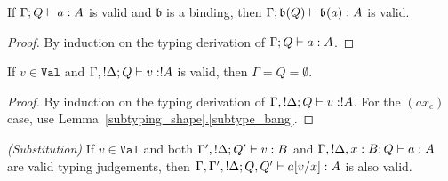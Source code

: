 \documentclass{article}
\begin{document}
\begin{lemma}
\label{binding_judgement}
If $\Gamma;Q \vdash a:A$ is valid and $\mathfrak{b}$ is a 
binding, then $\Gamma;\mathfrak{b} (Q) \vdash \mathfrak{b}(a):A$ is valid.
\end{lemma}

\begin{proof}
By induction on the typing derivation of $\Gamma;Q \vdash a:A$.
\end{proof}

\begin{lemma}
\label{context_value}
If $v\in\mathtt{Val}$ and $\Gamma,!\Delta;Q \vdash v:!A$ is valid, 
then $\Gamma=Q=\emptyset$.
\end{lemma}

\begin{proof}
By induction on the typing derivation of $\Gamma,!\Delta;Q \vdash v:!A$. For 
the $(ax_c)$ case, use Lemma~\hyperref[subtype_bang]{\ref*{subtyping_shape}.\ref*{subtype_bang}}.
\end{proof}

\begin{lemma}
\emph{(Substitution)}
\label{substitution}
If $v\in\mathtt{Val}$ and both $\Gamma',!\Delta;Q' \vdash v:B$ and 
$\Gamma,!\Delta,x:B;Q \vdash a:A$ are valid typing judgements, 
then $\Gamma,\Gamma',!\Delta;Q,Q' \vdash a[v/x]:A$ is also valid.
\end{lemma}
\end{document}
